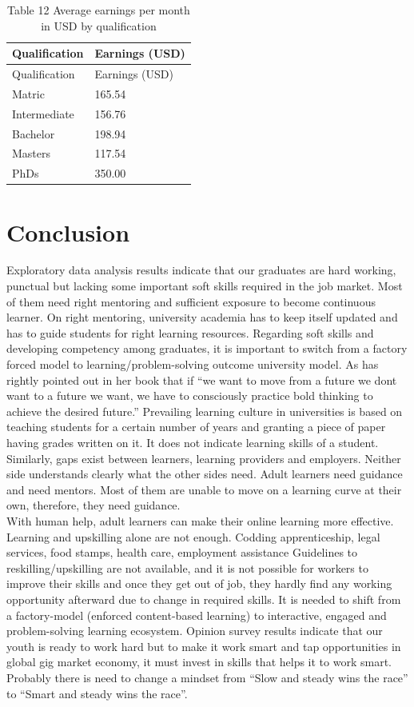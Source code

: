 \documentclass[
  12pt]{article}
\begin{document}
\begin{longtable}[]{@{}ll@{}}
\caption{Table 12 Average earnings per month in USD by
qualification}\tabularnewline
\toprule()
Qualification & Earnings (USD) \\
\midrule()
\endfirsthead
\toprule()
Qualification & Earnings (USD) \\
\midrule()
\endhead
Matric & 165.54 \\
Intermediate & 156.76 \\
Bachelor & 198.94 \\
Masters & 117.54 \\
PhDs & 350.00 \\
\bottomrule()
\end{longtable}

\hypertarget{sec-conc}{%
\section{Conclusion}\label{sec-conc}}

Exploratory data analysis results indicate that our graduates are hard
working, punctual but lacking some important soft skills required in the
job market. Most of them need right mentoring and sufficient exposure to
become continuous learner. On right mentoring, university academia has
to keep itself updated and has to guide students for right learning
resources. Regarding soft skills and developing competency among
graduates, it is important to switch from a factory forced model to
learning/problem-solving outcome university model. As \citet{Weise2020}
has rightly pointed out in her book that if ``we want to move from a
future we dont want to a future we want, we have to consciously practice
bold thinking to achieve the desired future.'' Prevailing learning
culture in universities is based on teaching students for a certain
number of years and granting a piece of paper having grades written on
it. It does not indicate learning skills of a student. Similarly, gaps
exist between learners, learning providers and employers. Neither side
understands clearly what the other sides need. Adult learners need
guidance and need mentors. Most of them are unable to move on a learning
curve at their own, therefore, they need guidance.\\
With human help, adult learners can make their online learning more
effective. Learning and upskilling alone are not enough. Codding
apprenticeship, legal services, food stamps, health care, employment
assistance Guidelines to reskilling/upskilling are not available, and it
is not possible for workers to improve their skills and once they get
out of job, they hardly find any working opportunity afterward due to
change in required skills. It is needed to shift from a factory-model
(enforced content-based learning) to interactive, engaged and
problem-solving learning ecosystem. Opinion survey results indicate that
our youth is ready to work hard but to make it work smart and tap
opportunities in global gig market economy, it must invest in skills
that helps it to work smart. Probably there is need to change a mindset
from ``Slow and steady wins the race'' to ``Smart and steady wins the
race''.
\end{document}
